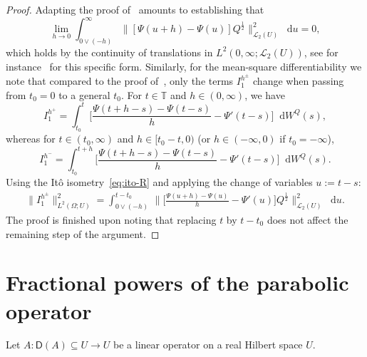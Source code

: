 \documentclass[reqno]{amsart}
\numberwithin{equation}{section}
\newcommand{\bbT}{\mathbb{T}}
\newcommand{\rd}{\mathop{}\!\mathrm{d}}
\newcommand{\from}{\colon}
\theoremstyle{remark}
\theoremstyle{definition}
\begin{document}
\begin{proof} 
	Adapting the proof of~\cite[Proposition~3.18]{KW2022}
	amounts to establishing that
	\[
	\lim_{h \to 0} 
	\int_{0 \vee (-h)}^\infty 
	\| [\Psi(u + h) - \Psi(u)] Q^\frac{1}{2}\|^2_{\mathscr L_2(U)} \rd u
	=
	0,
	\]
	which holds by the continuity of translations in $L^2(0,\infty; \mathscr L_2(U))$, 
	see for instance~\cite[Lemma~A.4]{KW2022} for this specific form.
	Similarly, for the mean-square differentiability
	we note that compared to the proof of~\cite[Proposition~3.21]{KW2022}, only the terms
	$I_1^{h^\pm}$ change when passing from $t_0 = 0$ to a general $t_0$. 
	For $t \in \bbT$ and $h \in (0, \infty)$, we have
	\begin{equation}
		I^{h^+}_1 = \int_{t_0}^{t} 
		\biggl[ \frac{\Psi(t+h-s)-\Psi(t-s)}{h} - \Psi'(t-s)\biggr] \rd W^Q(s),
	\end{equation}
	whereas for $t \in (t_0, \infty)$ and $h \in [t_0 - t, 0)$ (or $h \in (-\infty, 0)$ if $t_0 = -\infty$),
	\begin{equation}
		I^{h^-}_1 = \int_{t_0}^{t+h} 
		\biggl[ \frac{\Psi(t+h-s)-\Psi(t-s)}{h} - \Psi'(t-s)\biggr] \rd W^Q(s).
	\end{equation}
	Using the It\^o isometry~\eqref{eq:ito-R} and applying the change of variables $u := t - s$:
	\begin{align}
		\bigl\| I^{h^{\pm}}_1 \bigr\|^2_{L^2(\Omega; U)}
		=
		\int_{0 \vee (-h)}^{t-t_0} \,
		\biggl\| \biggl[\frac{\Psi(u+h)-\Psi(u)}{h} - \Psi'(u)\biggr] Q^\frac{1}{2}\biggr\|^2_{\mathscr L_2(U)} \rd u.
	\end{align}
	The proof is finished upon noting that replacing $t$ by $t - t_0$ does not affect the remaining step of the argument.
\end{proof}

\section{Fractional powers of the parabolic operator}\label{app:frac-powers}
Let $A \from \mathsf D(A) \subseteq U \to U$ be a linear operator
on a real Hilbert space $U$.
\end{document}
